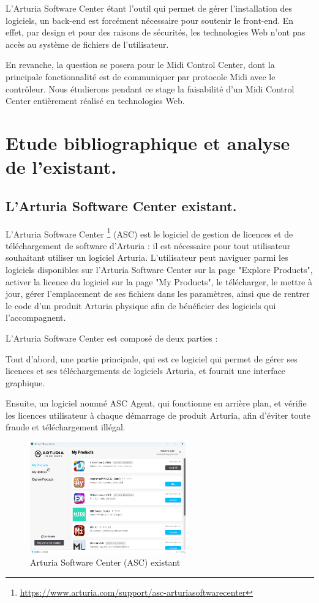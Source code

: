 \documentclass[francais]{rapportPFE}  %
\begin{document}
L'Arturia Software Center étant l'outil qui permet de gérer l'installation des logiciels, un back-end est forcément nécessaire pour soutenir le front-end. En effet, par design et pour des raisons de sécurités, les technologies Web n'ont pas accès au système de fichiers de l'utilisateur.

En revanche, la question se posera pour le Midi Control Center, dont la principale fonctionnalité est de communiquer par protocole Midi avec le contrôleur. Nous étudierons pendant ce stage la faisabilité d'un Midi Control Center entièrement réalisé en technologies Web.

\section{Etude bibliographique et analyse de l'existant.}
\subsection{L'Arturia Software Center existant.}

L’Arturia Software Center
\footnote{\url{https://www.arturia.com/support/asc-arturiasoftwarecenter}}
 (ASC) est le logiciel de gestion de licences et de
téléchargement de software d’Arturia : il est nécessaire pour tout utilisateur
souhaitant utiliser un logiciel Arturia. L'utilisateur peut naviguer parmi les logiciels disponibles sur l'Arturia Software Center sur la page "Explore Products", activer la licence du logiciel sur la page "My Products", le télécharger, le mettre à jour, gérer l'emplacement de ses fichiers dans les paramètres, ainsi que de rentrer le code d'un produit Arturia physique afin de bénéficier des logiciels qui l'accompagnent.

L’Arturia Software Center est composé de deux parties : 

Tout d'abord, une partie principale, qui est ce logiciel qui permet de gérer ses licences et ses téléchargements de logiciels Arturia, et fournit une interface graphique.

Ensuite, un logiciel nommé ASC Agent, qui fonctionne en arrière plan, et vérifie les licences utilisateur à chaque démarrage de produit Arturia, afin d'éviter toute fraude et téléchargement illégal.

\begin{figure}[!t]
	\centering
	\includegraphics[width=0.6\textwidth]{graphics/asc_existant.png}
	\begin{tiny}
	\end{tiny}
	\caption{Arturia Software Center (ASC) existant}
	\label{fig:Expe}
\end{figure}
\end{document}
